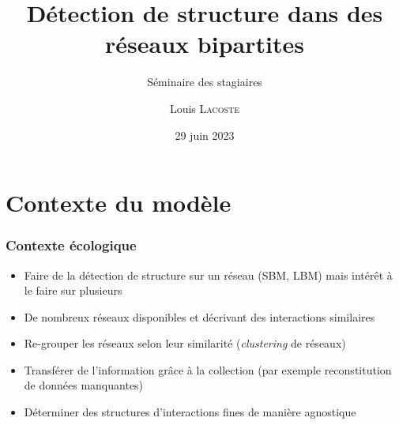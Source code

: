 \documentclass{beamer}
\subtitle{Séminaire des stagiaires}
\title[Collections de réseaux bipartites]{Détection de structure dans des réseaux bipartites}
\author[L. Lacoste]{Louis \textsc{Lacoste}} %
\date{29 juin 2023}
\begin{document}
\begin{frame}
    \maketitle
\end{frame}

\section{Contexte du modèle}
\label{sec:contexte-du-modele}
\begin{frame}
    \frametitle{Contexte écologique}
    \begin{itemize}
        \item Faire de la détection de structure sur un réseau (SBM, LBM) mais intérêt à le faire sur plusieurs
        \item De nombreux réseaux disponibles \parencite{WebLifeEcological} et décrivant des interactions similaires
        \item Re-grouper les réseaux selon leur similarité (\emph{clustering} de réseaux)
        \item Transférer de l'information grâce à la collection (par exemple reconstitution de données manquantes)
        \item Déterminer des structures d'interactions fines de manière agnostique %
    \end{itemize}
\end{frame}
\end{document}
